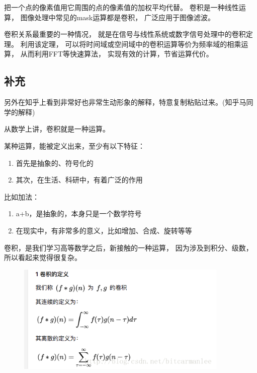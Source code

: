 把一个点的像素值用它周围的点的像素值的加权平均代替。%
卷积是一种线性运算，%
图像处理中常见的mask运算都是卷积，%
广泛应用于图像滤波。%

卷积关系最重要的一种情况，%
就是在信号与线性系统或数字信号处理中的卷积定理。%
利用该定理，%
可以将时间域或空间域中的卷积运算等价为频率域的相乘运算，%
从而利用FFT等快速算法，%
实现有效的计算，节省运算代价。%

\subsection{补充}
另外在知乎上看到非常好也非常生动形象的解释，特意复制粘贴过来。(知乎马同学的解释)

从数学上讲，卷积就是一种运算。

\noindent{}某种运算，能被定义出来，至少有以下特征：
\begin{enumerate}
\item{首先是抽象的、符号化的}
\item{其次，在生活、科研中，有着广泛的作用}
\end{enumerate}

\noindent{}比如加法：
\begin{enumerate}
\item{a+b，是抽象的，本身只是一个数学符号}
\item{在现实中，有非常多的意义，比如增加、合成、旋转等等}
\end{enumerate}

卷积，是我们学习高等数学之后，新接触的一种运算，%
因为涉及到积分、级数，所以看起来觉得很复杂。%
\begin{figure}[hpbt]
  \centering
  \includegraphics[width=0.9\textwidth]{图像及其数学与物理背景/Figures/原理1}
\end{figure}

